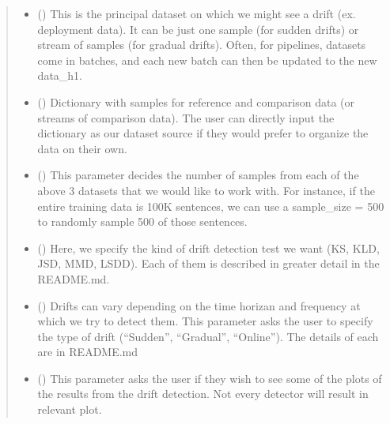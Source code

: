 \documentclass[letterpaper,10pt,english]{sphinxmanual}
\begin{document}
\begin{fulllineitems}
\begin{fulllineitems}
\begin{quote}
\begin{description}
\begin{itemize}
\item {} 
\sphinxAtStartPar
{} (\sphinxstyleliteralemphasis{\sphinxupquote{, }}) \textendash{} This is the principal dataset on which we might see a drift (ex. deployment data).
It can be just one sample (for sudden drifts) or stream of samples (for gradual drifts).
Often, for pipelines, datasets come in batches, and each new batch can then be updated
to the new data\_h1.

\item {} 
\sphinxAtStartPar
{} () \textendash{} Dictionary with samples for reference and comparison data (or streams of comparison data).
The user can directly input the dictionary as our dataset source if they would prefer to
organize the data on their own.

\item {} 
\sphinxAtStartPar
{} () \textendash{} This parameter decides the number of samples from each of the above 3 datasets that we would
like to work with. For instance, if the entire training data is 100K sentences, we can use
a sample\_size = 500 to randomly sample 500 of those sentences.

\item {} 
\sphinxAtStartPar
{} () \textendash{} Here, we specify the kind of drift detection test we want (KS, KLD, JSD, MMD, LSDD).
Each of them is described in greater detail in the README.md.

\item {} 
\sphinxAtStartPar
{} () \textendash{} Drifts can vary depending on the time horizan and frequency at which we try to detect
them. This parameter asks the user to specify the type of drift (“Sudden”, “Gradual”,
“Online”). The details of each are in README.md

\item {} 
\sphinxAtStartPar
{} () \textendash{} This parameter asks the user if they wish to see some of the plots of the results
from the drift detection. Not every detector will result in relevant plot.


\end{itemize}
\end{description}
\end{quote}
\end{fulllineitems}
\end{fulllineitems}
\end{document}
